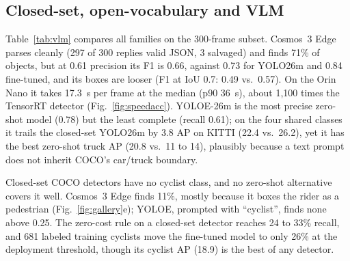 \documentclass[conference]{IEEEtran}
\begin{document}
\subsection{Closed-set, open-vocabulary and VLM}
Table~\ref{tab:vlm} compares all families on the 300-frame subset. Cosmos~3 Edge parses cleanly (297 of 300 replies
valid JSON, 3 salvaged) and finds 71\% of objects, but at 0.61 precision its F1 is 0.66, against 0.73 for YOLO26m
and 0.84 fine-tuned, and its boxes are looser (F1 at IoU 0.7: 0.49 vs.\ 0.57). On the Orin Nano it takes 17.3~s per
frame at the median (p90 36~s), about 1{,}100 times the TensorRT detector (Fig.~\ref{fig:speedacc}). YOLOE-26m is
the most precise zero-shot model (0.78) but the least complete (recall 0.61); on the four shared classes it trails
the closed-set YOLO26m by 3.8 AP on KITTI (22.4 vs.\ 26.2), yet it has the best zero-shot truck AP (20.8 vs.\ 11 to
14), plausibly because a text prompt does not inherit COCO's car/truck boundary.

Closed-set COCO detectors have no cyclist class, and no zero-shot alternative covers it well. Cosmos~3 Edge finds 11\%, mostly because it boxes the rider as a
pedestrian (Fig.~\ref{fig:gallery}e); YOLOE, prompted with ``cyclist'', finds none above 0.25. The zero-cost rule on a
closed-set detector reaches 24 to 33\% recall, and 681 labeled training cyclists move the fine-tuned model to only
26\% at the deployment threshold, though its cyclist AP (18.9) is the best of any detector.
\end{document}
